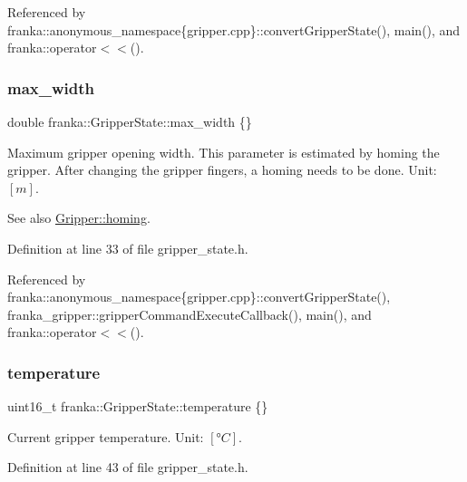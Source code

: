 Referenced by franka\+::anonymous\+\_\+namespace\{gripper.\+cpp\}\+::convert\+Gripper\+State(), main(), and franka\+::operator$<$$<$().

\mbox{\label{structfranka_1_1GripperState_ab71a26356c2898c49609bf991843e166}} 
\subsubsection{\texorpdfstring{max\+\_\+width}{max\_width}}
{\footnotesize\ttfamily double franka\+::\+Gripper\+State\+::max\+\_\+width \{\}}

Maximum gripper opening width. This parameter is estimated by homing the gripper. After changing the gripper fingers, a homing needs to be done. Unit\+: $[m]$.

\begin{DoxySeeAlso}{See also}
\hyperlink{classfranka_1_1Gripper_aef356f93a4c3b9d6b2532c29126d478c}{Gripper\+::homing}. 
\end{DoxySeeAlso}


Definition at line 33 of file gripper\+\_\+state.\+h.



Referenced by franka\+::anonymous\+\_\+namespace\{gripper.\+cpp\}\+::convert\+Gripper\+State(), franka\+\_\+gripper\+::gripper\+Command\+Execute\+Callback(), main(), and franka\+::operator$<$$<$().

\mbox{\label{structfranka_1_1GripperState_aa6733fa786dbf3b073acbaf3779e34b3}} 
\subsubsection{\texorpdfstring{temperature}{temperature}}
{\footnotesize\ttfamily uint16\+\_\+t franka\+::\+Gripper\+State\+::temperature \{\}}

Current gripper temperature. Unit\+: $[°C]$. 

Definition at line 43 of file gripper\+\_\+state.\+h.



